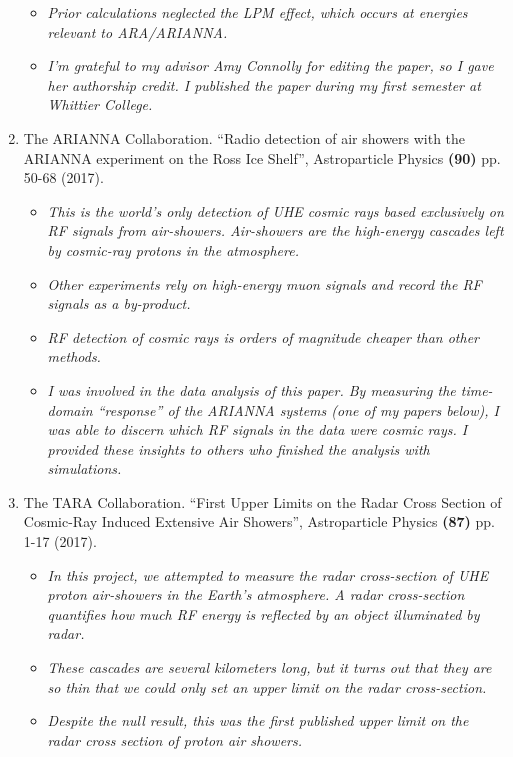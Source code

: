 \documentclass[../../main.tex]{subfiles}
\begin{document}
\begin{enumerate}
\begin{itemize}
\item \textit{Prior calculations neglected the LPM effect, which occurs at energies relevant to ARA/ARIANNA.}
\item \textit{I'm grateful to my advisor Amy Connolly for editing the paper, so I gave her authorship credit.  I published the paper during my first semester at Whittier College.}
\end{itemize}
\item The ARIANNA Collaboration. ``Radio detection of air showers with the ARIANNA experiment on the Ross Ice Shelf'', Astroparticle Physics \textbf{(90)} pp. 50-68 (2017).
\begin{itemize}
\item \textit{This is the world's only detection of UHE cosmic rays based exclusively on RF signals from air-showers.  Air-showers are the high-energy cascades left by cosmic-ray protons in the atmosphere.}
\item \textit{Other experiments rely on high-energy muon signals and record the RF signals as a by-product.}
\item \textit{RF detection of cosmic rays is orders of magnitude cheaper than other methods.}
\item \textit{I was involved in the data analysis of this paper.  By measuring the time-domain ``response'' of the ARIANNA systems (one of my papers below), I was able to discern which RF signals in the data were cosmic rays.  I provided these insights to others who finished the analysis with simulations.}
\end{itemize}
\item The TARA Collaboration. ``First Upper Limits on the Radar Cross Section of Cosmic-Ray Induced Extensive Air Showers'', Astroparticle Physics \textbf{(87)} pp. 1-17 (2017).
\begin{itemize}
\item \textit{In this project, we attempted to measure the radar cross-section of UHE proton air-showers in the Earth's atmosphere. A radar cross-section quantifies how much RF energy is reflected by an object illuminated by radar.}
\item \textit{These cascades are several kilometers long, but it turns out that they are so thin that we could only set an upper limit on the radar cross-section.}
\item \textit{Despite the null result, this was the first published upper limit on the radar cross section of proton air showers.}
\end{itemize}

\end{enumerate}
\end{document}
